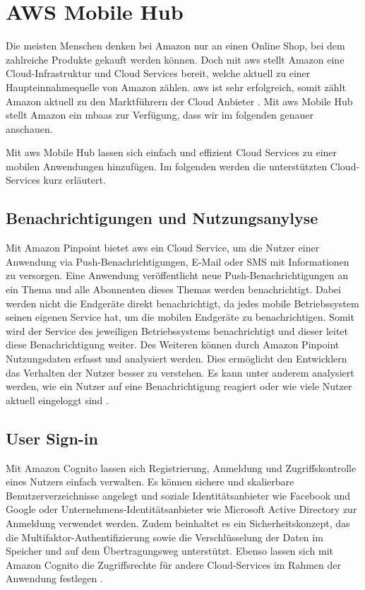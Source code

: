 \section{AWS Mobile Hub}
Die meisten Menschen denken bei Amazon nur an einen Online Shop, bei dem zahlreiche Produkte gekauft werden können. Doch mit \gls{aws} stellt Amazon eine Cloud-Infrastruktur und Cloud Services bereit, welche aktuell zu einer Haupteinnahmequelle von Amazon zählen. \gls{aws} ist sehr erfolgreich, somit zählt Amazon aktuell zu den Marktführern der Cloud Anbieter \cite{statistacloudmarketshare}. Mit \gls{aws} Mobile Hub stellt Amazon ein \gls{mbaas} zur Verfügung, dass wir im folgenden genauer anschauen. \newline 

Mit \gls{aws} Mobile Hub lassen sich einfach und effizient Cloud Services zu einer mobilen Anwendungen hinzufügen. Im folgenden werden die unterstützten Cloud-Services kurz erläutert.


\subsection{Benachrichtigungen und Nutzungsanylyse}
Mit Amazon Pinpoint bietet \gls{aws} ein Cloud Service, um die Nutzer einer Anwendung via Push-Benachrichtigungen, E-Mail oder SMS mit Informationen zu versorgen. Eine Anwendung veröffentlicht neue Push-Benachrichtigungen an ein Thema und alle Abonnenten dieses Themas werden benachrichtigt. Dabei werden nicht die Endgeräte direkt benachrichtigt, da jedes mobile Betriebssystem seinen eigenen Service hat, um die mobilen Endgeräte zu benachrichtigen. Somit wird der Service des jeweiligen Betriebssystems benachrichtigt und dieser leitet diese Benachrichtigung weiter. Des Weiteren können durch Amazon Pinpoint Nutzungsdaten erfasst und analysiert werden. Dies ermöglicht den Entwicklern das Verhalten der Nutzer besser zu verstehen. Es kann unter anderem  analysiert werden, wie ein Nutzer auf eine Benachrichtigung reagiert oder wie viele Nutzer aktuell eingeloggt sind \cite{AmazonPinpoint}.

\subsection{User Sign-in}
Mit Amazon Cognito lassen sich Registrierung, Anmeldung und Zugriffskontrolle eines Nutzers einfach verwalten. Es können sichere und skalierbare Benutzerverzeichnisse angelegt und soziale Identitätsanbieter wie Facebook und Google oder Unternehmens-Identitätsanbieter wie Microsoft Active Directory zur Anmeldung verwendet werden. Zudem beinhaltet es ein Sicherheitskonzept, das die Multifaktor-Authentifizierung sowie die Verschlüsselung der Daten im Speicher und auf dem Übertragungsweg unterstützt. Ebenso lassen sich mit Amazon Cognito die Zugriffsrechte für andere Cloud-Services im Rahmen der Anwendung festlegen \cite{AmazonCognito}.

